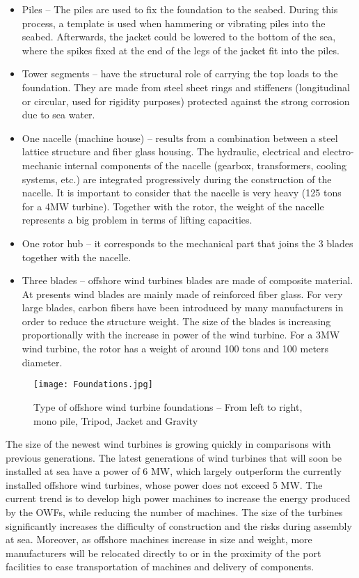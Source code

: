 \begin{itemize}
\item Piles -- The piles are used to fix the foundation to the seabed. During this process, a template is used when hammering or vibrating piles into the seabed. Afterwards, the jacket could be lowered to the bottom of the sea, where the spikes fixed at the end of the legs of the jacket fit into the piles.
\item Tower segments -- have the structural role of carrying the top loads to the foundation. They are made from steel sheet rings and stiffeners (longitudinal or circular, used for rigidity purposes) protected against the strong corrosion due to sea water.
\item One nacelle (machine house) -- results from a combination between a steel lattice structure and fiber glass housing. The hydraulic, electrical and electro-mechanic internal components of the nacelle (gearbox, transformers, cooling systems, etc.) are integrated progressively during the construction of the nacelle. It is important to consider that the nacelle is very heavy (125 tons for a 4MW turbine). Together with the rotor, the weight of the nacelle represents a big problem in terms of lifting capacities.
\item One rotor hub -- it corresponds to the mechanical part that joins the 3 blades together with the nacelle.
\item Three blades -- offshore wind turbines blades are made of composite material. At presents wind blades are mainly made of reinforced fiber glass. For very large blades, carbon fibers have been introduced by many manufacturers in order to reduce the structure weight. The size of the blades is increasing proportionally with the increase in power of the wind turbine. For a 3MW wind turbine, the rotor has a weight of around 100 tons and 100 meters diameter.
\end{itemize}


\begin{figure}[!hbp]
\begin{center}
\texttt{[image: Foundations.jpg]} 
\end{center}
\caption{Type of offshore wind turbine foundations -- From left to right, mono pile, Tripod, Jacket and Gravity}
\label{FigureFoundations}
\end{figure}

The size of the newest wind turbines is growing quickly in comparisons with previous generations. The latest generations of wind turbines that will soon be installed at sea have a power of 6 MW, which largely outperform the currently installed offshore wind turbines, whose power does not exceed 5 MW. The current trend is to develop high power machines to increase the energy produced by the OWFs, while reducing the number of machines. The size of the turbines significantly increases the difficulty of construction and the risks during assembly at sea. Moreover, as offshore machines increase in size and weight, more manufacturers will be relocated directly to or in the proximity of the port facilities to ease transportation of machines and delivery of components.

